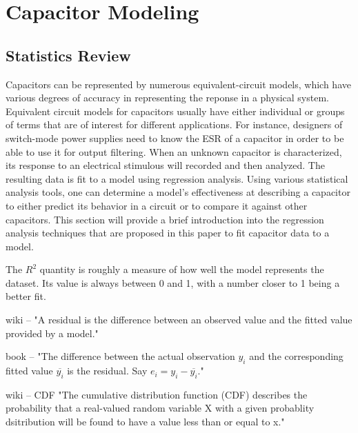 \section {Capacitor Modeling}
\subsection{Statistics Review}
Capacitors can be represented by numerous equivalent-circuit models, which have various degrees of accuracy in representing the reponse in a physical system. Equivalent circuit models for capacitors usually have either individual or groups of terms that are  of interest for different applications. For instance, designers of switch-mode power supplies need to know the ESR of a capacitor in order to be able to use it for output filtering. When an unknown capacitor is characterized, its response to an electrical stimulous will recorded and then analyzed. The resulting data is fit to a model using regression analysis. Using various statistical analysis tools, one can determine a model's effectiveness at describing a capacitor to either predict its behavior in a circuit or to compare it against other capacitors. This section will provide a brief introduction into the regression analysis techniques that are proposed in this paper to fit capacitor data to a model.

The $R^2$ quantity is roughly a measure of how well the model represents the dataset. Its value is always between 0 and 1, with a number closer to 1 being a better fit. 

wiki -- "A residual is the difference between an observed value and the fitted value provided by a model."

book -- "The difference between the actual observation $y_i$ and the corresponding fitted value $\overline{y_i}$ is the residual. Say $e_i = y_i - \overline{y_i}$."

wiki -- CDF "The cumulative distribution function (CDF) describes the probability that a real-valued random variable X with a given probablity dsitribution will be found to have a value less than or equal to x."
